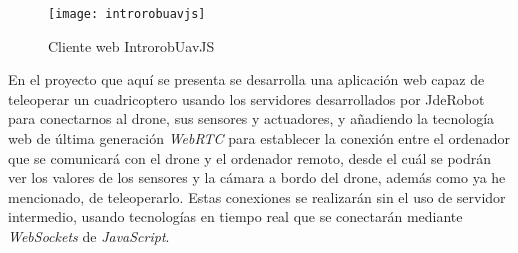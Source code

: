 \begin{figure}[htb]
\centering
\texttt{[image: introrobuavjs]}
\caption{Cliente web IntrorobUavJS}
\label{fig:introrobuavjs}
\end{figure}


En el proyecto que aquí se presenta se desarrolla una aplicación web capaz de teleoperar un cuadricoptero usando los servidores desarrollados por JdeRobot para conectarnos al drone, sus sensores y actuadores, y añadiendo la tecnología web de última generación \emph{WebRTC} para establecer la conexión entre el ordenador que se comunicará con el drone y el ordenador remoto, desde el cuál se podrán ver los valores de los sensores y la cámara a bordo del drone, además como ya he mencionado, de teleoperarlo. Estas conexiones se realizarán sin el uso de servidor intermedio, usando tecnologías en tiempo real que se conectarán mediante \emph{WebSockets} de \emph{JavaScript}.\\



